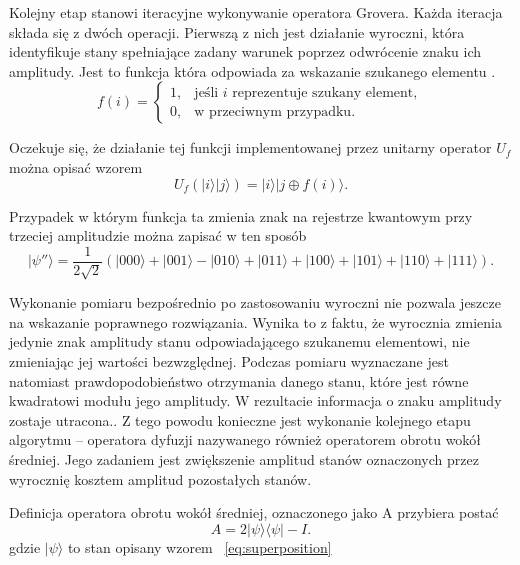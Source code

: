 Kolejny etap stanowi iteracyjne wykonywanie operatora Grovera. Każda iteracja składa się z dwóch operacji. Pierwszą z nich jest działanie wyroczni, która identyfikuje stany spełniające zadany warunek poprzez odwrócenie znaku ich amplitudy. Jest to funkcja która odpowiada za wskazanie szukanego elementu \cite[s.~162, wz.~(4.67)]{inf_kwant}.
\begin{equation}
\label{eq:oracle}
f(i)=
\begin{cases}
1,& \text{jeśli } i \text{ reprezentuje szukany element},\\
0,& \text{w przeciwnym przypadku.}
\end{cases}
\end{equation}

Oczekuje się, że działanie tej funkcji implementowanej przez unitarny operator $U_f$ można opisać wzorem
\cite[s.~162, wz.~(4.68)]{inf_kwant}   
\begin{equation}
\label{eq:oracle_quantum}
U_f(|i\rangle|j\rangle)=|i\rangle|j\oplus f(i)\rangle.
\end{equation}

Przypadek w którym funkcja ta zmienia znak na rejestrze kwantowym przy trzeciej amplitudzie można zapisać w ten sposób \cite[s~278, wz.~(5.367)]{inf_kwant}  
\begin{equation}
\label{eq:oracle_example}
|\psi''\rangle = \frac1{2\sqrt2} ( |000\rangle+ |001\rangle- |010\rangle+ |011\rangle+ |100\rangle+ |101\rangle+ |110\rangle+ |111\rangle ).
\end{equation}

Wykonanie pomiaru bezpośrednio po zastosowaniu wyroczni nie pozwala jeszcze na wskazanie poprawnego rozwiązania. Wynika to z faktu, że wyrocznia zmienia jedynie znak amplitudy stanu odpowiadającego szukanemu elementowi, nie zmieniając jej wartości bezwzględnej. Podczas pomiaru wyznaczane jest natomiast prawdopodobieństwo otrzymania danego stanu, które jest równe kwadratowi modułu jego amplitudy. W rezultacie informacja o znaku amplitudy zostaje utracona.. Z tego powodu konieczne jest wykonanie kolejnego etapu algorytmu – operatora dyfuzji nazywanego również operatorem obrotu wokół średniej. Jego zadaniem jest zwiększenie amplitud stanów oznaczonych przez wyrocznię kosztem amplitud pozostałych stanów.

Definicja operatora obrotu wokół średniej, oznaczonego jako A przybiera postać \cite[s.~163, wz.~(4.71)]{inf_kwant}   
\begin{equation}
\label{eq:diffusion_operator}
A=2|\psi\rangle\langle\psi|-I.
\end{equation}
\noindent
gdzie $|\psi\rangle$ to stan opisany wzorem ~\eqref{eq:superposition}

